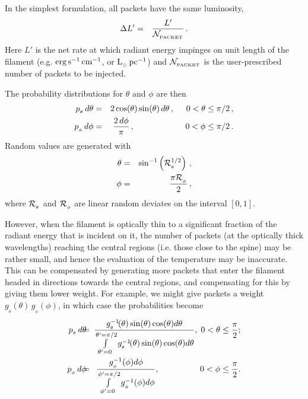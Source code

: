 \documentclass[usenatbib]{mn2e}
\numberwithin{equation}{section}
\begin{document}
In the simplest formulation, all packets have the same luminosity, 
\begin{eqnarray}
\Delta L'&=&\frac{L'}{{\cal N}_{_{\rm PACKET}}}\,.
\end{eqnarray}
Here $L'$ is the net rate at which radiant energy impinges on unit length of the filament (e.g. ${\rm erg}\,{\rm s}^{-1}\,{\rm cm}^{-1}$, or ${\rm L}_{_\odot}\,{\rm pc}^{-1}$) and ${\cal N}_{_{\rm PACKET}}$ is the user-prescribed number of packets to be injected.

The probability distributions for $\theta$ and $\phi$ are then
\begin{eqnarray}
p_{_\theta}\,d\theta&=&2\cos(\theta)\sin(\theta)\,d\theta\,,\hspace{0.5cm}0<\theta\leq\pi/2\,,\\
p_{_\phi}\,d\phi&=&\frac{2\,d\phi}{\pi}\,,\hspace{2.16cm}0<\phi\leq\pi/2\,.
\end{eqnarray}
Random values are generated with 
\begin{eqnarray}
\theta&=&\sin^{-1}\left({\cal R}_{_\theta}^{1/2}\right)\,,\\
\phi&=&\frac{\pi {\cal R}_{_\phi}}{2}\,,
\end{eqnarray}
where ${\cal R}_{_\theta}$ and ${\cal R}_{_\phi}$ are linear random deviates on the interval $[0,1]$.

However, when the filament is optically thin to a significant fraction of the radiant energy that is incident on it, the number of packets (at the optically thick wavelengths) reaching the central regions (i.e. those close to the spine) may be rather small, and hence the evaluation of the temperature may be inaccurate. This can be compensated by generating more packets that enter the filament headed in directions towards the central regions, and compensating for this by giving them lower weight. For example, we might give packets a weight $g_{_\theta}\!(\theta)\,g_{_\phi}\!(\phi)$, in which case the probabilities become
\begin{eqnarray}
p_{_\theta}\,d\theta\!\!&\!\!=\!\!\!&\!\frac{g_{_\theta}^{-1}\!(\theta)\sin(\theta)\cos(\theta)d\theta}{\int\limits_{\theta'=0}^{\theta'=\pi/2}g_{_\theta}^{-1}\!(\theta)\sin(\theta)\cos(\theta)d\theta},\;0<\theta\leq\frac{\pi}{2};\\
p_{_\phi}\,d\phi\!\!&\!\!=\!\!&\!\!\frac{g_{_\phi}^{-1}(\phi)d\phi}{\int\limits_{\phi'=0}^{\phi'=\pi/2}g_{_\phi}^{-1}(\phi)d\phi},\hspace{1.72cm}0<\phi\leq\frac{\pi}{2}.
\end{eqnarray}
\end{document}
